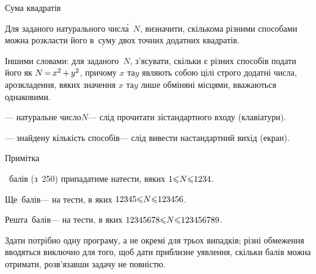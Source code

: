 \begin{problemAllDefault}{Сума квадратів}

Для заданого натурального числ\'{а}~$N$, визначити, скількома різними способами можна розкласти його в~суму двох точних додатних квадратів. 

Іншими словами: для заданого~$N$, з’ясувати, скільки є різних способів подати його як $N\dib{{=}}x^2\dib{{+}}y^2$, причому $x$ та\nolinebreak[3] $y$ являють собою цілі строго додатні числа, а\nolinebreak[3] розкладення, в\nolinebreak[3] яких значення $x$ та\nolinebreak[3] $y$ лише обміняні місцями, вважаються однаковими.


\InputFile	--- натуральне число\nolinebreak[3] $N$\nolinebreak[3] --- слід прочитати зі\nolinebreak[3] стандартного входу (клавіатури).

\OutputFile	--- знайдену кількість способів\nolinebreak[3] --- слід вивести на\nolinebreak[3] стандартний вихід (екран).


\Examples

\begin{exampleSimpleThree}{5em}{3em}{25.5em}{Примітка}%
%
%
%
\end{exampleSimpleThree}

~балів (з~250) припадатиме на\nolinebreak[3] тести, в\nolinebreak[3] яких $1{\leqslant}N{\leqslant}1234$.

Ще~балів\nolinebreak[3] --- на тести, в яких $12345{\leqslant}N{\leqslant}123456$.

Решта~балів\nolinebreak[3] --- на тести, в яких $12345678{\leqslant}N{\leqslant}123456789$.

Здати потрібно одну програму, а не окремі для трьох випадків; різні обмеження вводяться виключно для того, щоб дати приблизне уявлення, скільки балів можна отримати, розв’язавши задачу не повністю.

\end{problemAllDefault}